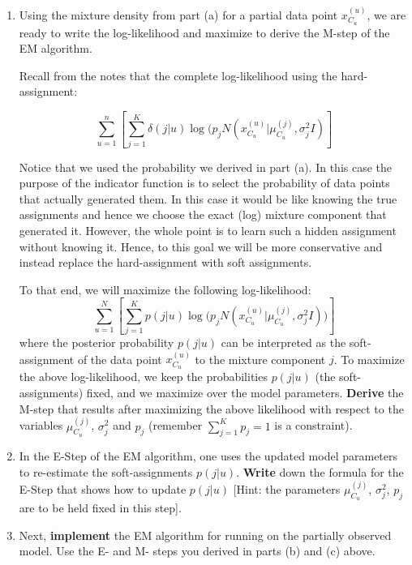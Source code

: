 \begin{enumerate}
\begin{enumerate}
\item Using the mixture density from part (a) for a partial data point $x^{(u)}_{C_u}$, we are ready to write the log-likelihood and maximize to derive the M-step of the EM algorithm. 

\color{blue}
Recall from the notes that the complete log-likelihood using the hard-assignment:

$$ \sum^n_{u=1} \left[ \sum^{K}_{j=1} \delta(j|u) \log( p_j N(x^{(u)}_{C_u} | \mu^{(j)}_{C_u}, \sigma^2_j I) \right]$$

Notice that we used the probability we derived in part (a). In this case the purpose of the indicator function is to select the probability of data points that actually generated them. In this case it would be like knowing the true assignments and hence we choose the exact (log) mixture component that generated it. However, the whole point is to learn such a hidden assignment without knowing it. Hence, to this goal we will be more conservative and instead replace the hard-assignment with soft assignments.
\color{black}

To that end, we will maximize the following log-likelihood:
$$ \sum_{u=1}^N \left[ \sum^{K}_{j=1} p(j|u) \log\bigl( p_j N(x^{(u)}_{C_u} | \mu^{(j)}_{C_u}, \sigma^2_j I)\bigr) \right]$$
where the posterior probability $p(j|u)$ can be interpreted as the soft-assignment of the data point $x^{(u)}_{C_u}$ to the mixture component $j$. To maximize the above log-likelihood, we keep the probabilities $p(j|u)$ (the soft-assignments) fixed, and we maximize over the model parameters. \textbf{Derive} the M-step that results after maximizing the above likelihood with respect to the variables $\mu^{(j)}_{C_u}$, $\sigma^2_j$ and $p_j$ (remember $\sum_{j=1}^K p_j=1$ is a constraint).  

\item In the E-Step of the EM algorithm, one uses the updated model parameters to re-estimate  the soft-assignments $p(j|u)$. \textbf{Write} down the formula for the E-Step that shows how to update $p(j|u)$ [Hint: the parameters $\mu^{(j)}_{C_u}$, $\sigma^2_j$, $p_j$ are to be held fixed in this step].

\item Next, \textbf{implement} the EM algorithm for running on the partially observed model. Use the E- and M- steps you derived in parts (b) and (c) above.


\end{enumerate}
\end{enumerate}
